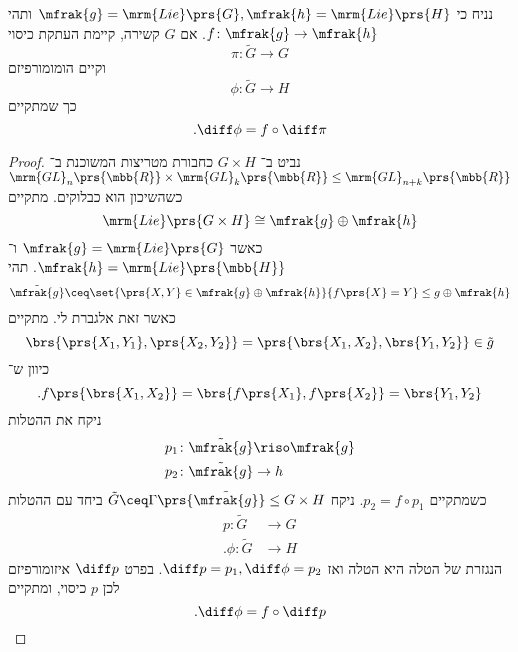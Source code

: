 \documentclass[10pt, twoside]{book}
\newcommand{\Lie}{\mrm{Lie}}
\begin{document}
\begin{theorem}
נניח כי
$\mfrak{g} = \Lie\prs{G}, \mfrak{h} = \Lie\prs{H}$
ותהי
$f \colon \mfrak{g} \to \mfrak{h}$.
אם
$G$
קשירה, קיימת העתקת כיסוי
\[\pi \colon \tilde{G} \to G\]
וקיים הומומורפיזם
\[\phi \colon \tilde{G} \to H\]
כך שמתקיים
\[\text{.} \diff \phi = f \circ \diff \pi\]
\end{theorem}

\begin{proof}
נביט ב־%
$G \times H$
כחבורת מטריצות המשוכנת ב־%
$\mrm{GL}_n\prs{\mbb{R}} \times \mrm{GL}_k\prs{\mbb{R}} \leq \mrm{GL}_{n+k}\prs{\mbb{R}}$
כשהשיכון הוא כבלוקים.
מתקיים
\[\Lie\prs{G \times H} \cong \mfrak{g} \oplus \mfrak{h}\]
כאשר
$\mfrak{g} = \Lie\prs{G}$
ו־%
$\mfrak{h} = \Lie\prs{\mbb{H}}$.
תהי
\[\tilde{\mfrak{g}} \ceq \set{\prs{X,Y} \in \mfrak{g} \oplus \mfrak{h}}{f\prs{X} = Y} \leq g \oplus \mfrak{h}\]
כאשר זאת אלגברת לי. מתקיים
\[\brs{\prs{X_1, Y_1}, \prs{X_2, Y_2}} = \prs{\brs{X_1, X_2}, \brs{Y_1, Y_2}} \in \tilde{g}\]
כיוון ש־%
\[\text{.} f\prs{\brs{X_1, X_2}} = \brs{f\prs{X_1}, f\prs{X_2}} = \brs{Y_1, Y_2}\]
ניקח את ההטלות
\begin{align*}
p_1 \colon \tilde{\mfrak{g}} &\riso \mfrak{g} \\
p_2 \colon \tilde{\mfrak{g}} &\to h
\end{align*}
כשמתקיים
$p_2 = f \circ p_1$.
ניקח
$\tilde{G} \ceq \Gamma\prs{\tilde{\mfrak{g}}} \leq G \times H$
ביחד עם ההטלות
\begin{align*}
p \colon \tilde{G} &\to G \\
\text{.} \phi \colon \tilde{G} &\to H
\end{align*}
הנגזרת של הטלה היא הטלה ואז
$\diff p = p_1, \diff \phi = p_2$.
בפרט
$\diff p$
איזומורפיזם לכן
$p$
כיסוי, ומתקיים
\[\text{.} \diff \phi = f \circ \diff p\]
\end{proof}
\end{document}
